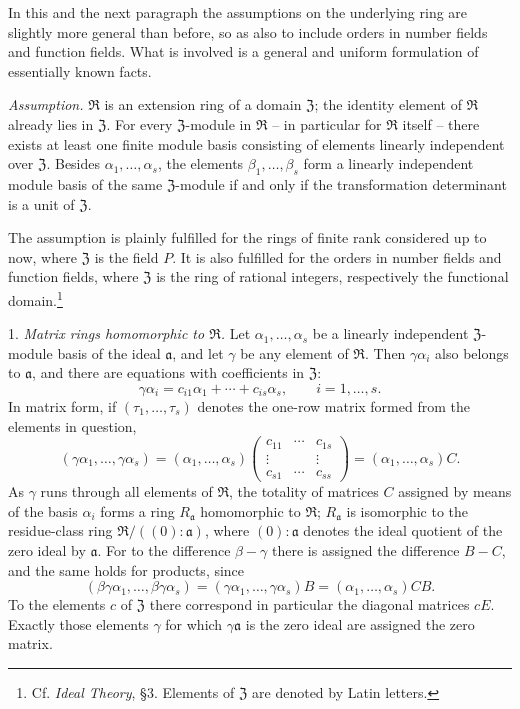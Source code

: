 \documentclass[11pt]{article}
\providecommand{\mR}{\mathfrak{R}}
\providecommand{\mZ}{\mathfrak{Z}}
\providecommand{\ma}{\mathfrak{a}}
\begin{document}
In this and the next paragraph the assumptions on the underlying ring are slightly more general than before, so as also to include orders in number fields and function fields. What is involved is a general and uniform formulation of essentially known facts.

\emph{Assumption.} $\mR$ is an extension ring of a domain $\mZ$; the identity element of $\mR$ already lies in $\mZ$. For every $\mZ$-module in $\mR$ -- in particular for $\mR$ itself -- there exists at least one finite module basis consisting of elements linearly independent over $\mZ$. Besides $\alpha_1,\ldots,\alpha_s$, the elements $\beta_1,\ldots,\beta_s$ form a linearly independent module basis of the same $\mZ$-module if and only if the transformation determinant is a unit of $\mZ$.

The assumption is plainly fulfilled for the rings of finite rank considered up to now, where $\mZ$ is the field $P$. It is also fulfilled for the orders in number fields and function fields, where $\mZ$ is the ring of rational integers, respectively the functional domain.\footnote{Cf. \emph{Ideal Theory}, §3. Elements of $\mZ$ are denoted by Latin letters.}

1. \emph{Matrix rings homomorphic to $\mR$.} Let $\alpha_1,\ldots,\alpha_s$ be a linearly independent $\mZ$-module basis of the ideal $\ma$, and let $\gamma$ be any element of $\mR$. Then $\gamma\alpha_i$ also belongs to $\ma$, and there are equations with coefficients in $\mZ$:
\[
        \gamma\alpha_i=c_{i1}\alpha_1+\cdots+c_{is}\alpha_s,
        \qquad i=1,\ldots,s.
\]
In matrix form, if $(\tau_1,\ldots,\tau_s)$ denotes the one-row matrix formed from the elements in question,
\[
 (\gamma\alpha_1,\ldots,\gamma\alpha_s)
 = (\alpha_1,\ldots,\alpha_s)
   \begin{pmatrix}
      c_{11}&\cdots&c_{1s}\\
      \vdots&&\vdots\\
      c_{s1}&\cdots&c_{ss}
   \end{pmatrix}
 = (\alpha_1,\ldots,\alpha_s)C.
\]
As $\gamma$ runs through all elements of $\mR$, the totality of matrices $C$ assigned by means of the basis $\alpha_i$ forms a ring $R_\ma$ homomorphic to $\mR$; $R_\ma$ is isomorphic to the residue-class ring $\mR/((0):\ma)$, where $(0):\ma$ denotes the ideal quotient of the zero ideal by $\ma$. For to the difference $\beta-\gamma$ there is assigned the difference $B-C$, and the same holds for products, since
\[
(\beta\gamma\alpha_1,\ldots,\beta\gamma\alpha_s)
=(\gamma\alpha_1,\ldots,\gamma\alpha_s)B
=(\alpha_1,\ldots,\alpha_s)CB.
\]
To the elements $c$ of $\mZ$ there correspond in particular the diagonal matrices $cE$. Exactly those elements $\gamma$ for which $\gamma\ma$ is the zero ideal are assigned the zero matrix.
\end{document}
